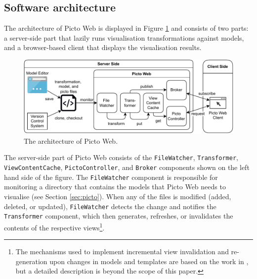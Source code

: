\documentclass[preprint,12pt, a4paper]{elsarticle}
\begin{document}
\subsection{Software architecture}
The architecture of Picto Web is displayed in Figure \ref{fig:architecture} and consists of two parts: a server-side part that lazily runs visualisation transformations against models, and a browser-based client that displays the visualisation results. 


\begin{figure}[h]
	\centering
	\includegraphics[width=\linewidth]{images/architecture.pdf}
	\caption{The architecture of Picto Web.}
	\label{fig:architecture}
\end{figure}

The server-side part of Picto Web consists of the \texttt{File\-Watch\-er}, \texttt{Trans\-form\-er}, \texttt{View\-Con\-tent\-Cache}, \texttt{Picto\-Control\-ler}, and \texttt{Broker} components shown on the left hand side of the figure. The \texttt{File\-Watcher} component is responsible for monitoring a directory that contains the models that Picto Web needs to visualise (see Section \ref{sec:picto}). When any of the files is modified (added, deleted, or updated), \texttt{FileWatcher} detects the change and notifies the \texttt{Transformer} component, which then generates, refreshes, or invalidates the contents of the respective views\footnote{The mechanisms used to implement incremental view invalidation and re-generation upon changes in models and templates are based on the work in \cite{ogunyomi2019}, but a detailed description is beyond the scope of this paper.}.
\end{document}

